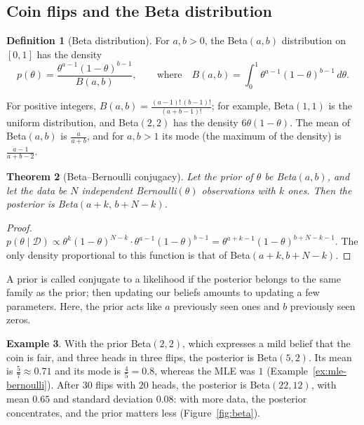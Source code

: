 \documentclass[11pt]{article}
\theoremstyle{definition}
\newtheorem{definition}{Definition}[section]
\newtheorem{example}[definition]{Example}
\theoremstyle{plain}
\newtheorem{theorem}[definition]{Theorem}
\theoremstyle{remark}
\begin{document}
\subsection{Coin flips and the Beta distribution}

\begin{definition}[Beta distribution]\label{def:beta}
    For $a, b > 0$, the Beta$(a, b)$ distribution on $[0, 1]$ has the density
    \[p(\theta) = \frac{\theta^{a-1}(1 - \theta)^{b-1}}{B(a, b)}, \qquad \text{where} \quad B(a, b) = \int_0^1 \theta^{a-1}(1 - \theta)^{b-1} \, d\theta.\]
\end{definition}

For positive integers, $B(a, b) = \frac{(a - 1)!\,(b - 1)!}{(a + b - 1)!}$; for example, Beta$(1, 1)$ is the uniform distribution, and Beta$(2, 2)$ has the density $6\theta(1 - \theta)$. The mean of Beta$(a, b)$ is $\frac{a}{a + b}$, and for $a, b > 1$ its mode (the maximum of the density) is $\frac{a - 1}{a + b - 2}$.

\begin{theorem}[Beta--Bernoulli conjugacy]\label{thm:beta-bernoulli}
    Let the prior of $\theta$ be Beta$(a, b)$, and let the data be $N$ independent Bernoulli$(\theta)$ observations with $k$ ones. Then the posterior is Beta$(a + k, \, b + N - k)$.
\end{theorem}

\begin{proof}
    $p(\theta \mid \mathcal{D}) \propto \theta^k(1 - \theta)^{N-k} \cdot \theta^{a-1}(1 - \theta)^{b-1} = \theta^{a + k - 1}(1 - \theta)^{b + N - k - 1}$. The only density proportional to this function is that of Beta$(a + k, b + N - k)$.
\end{proof}

A prior is called conjugate to a likelihood if the posterior belongs to the same family as the prior; then updating our beliefs amounts to updating a few parameters. Here, the prior acts like $a$ previously seen ones and $b$ previously seen zeros.

\begin{example}\label{ex:beta-coin}
    With the prior Beta$(2, 2)$, which expresses a mild belief that the coin is fair, and three heads in three flips, the posterior is Beta$(5, 2)$. Its mean is $\frac{5}{7} \approx 0.71$ and its mode is $\frac{4}{5} = 0.8$, whereas the MLE was $1$ (Example~\ref{ex:mle-bernoulli}). After $30$ flips with $20$ heads, the posterior is Beta$(22, 12)$, with mean $0.65$ and standard deviation $0.08$: with more data, the posterior concentrates, and the prior matters less (Figure~\ref{fig:beta}).
\end{example}
\end{document}
